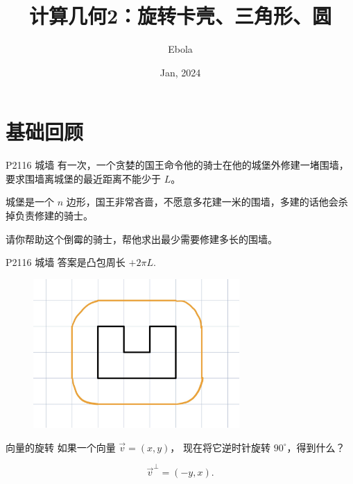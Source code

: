 \documentclass{beamer}
\author{Ebola}
\title{计算几何2：旋转卡壳、三角形、圆}
\institute{
    Institute of Mathematics, \\
    Zhejiang University.
}
\date{Jan, 2024}
\begin{document}
\begin{frame}
    \titlepage
\end{frame}

\begin{frame}
    \tableofcontents[sectionstyle=show,subsectionstyle=show/shaded/hide,subsubsectionstyle=show/shaded/hide]
\end{frame}

\section{基础回顾}

\begin{frame}[fragile]{P2116 城墙}
有一次，一个贪婪的国王命令他的骑士在他的城堡外修建一堵围墙，要求围墙离城堡的最近距离不能少于 $L$。

城堡是一个 $n$ 边形，国王非常吝啬，不愿意多花建一米的围墙，多建的话他会杀掉负责修建的骑士。

请你帮助这个倒霉的骑士，帮他求出最少需要修建多长的围墙。
\end{frame}

\begin{frame}[fragile]{P2116 城墙}
答案是凸包周长 $+2\pi L$.

\begin{figure}[H]
    \centering
    \includegraphics[width=0.7\textwidth]{pic/p2116.jpg}
\end{figure}
\end{frame}

\begin{frame}[fragile]{向量的旋转}
    如果一个向量 $\overrightarrow{v}=(x,y)$，
    现在将它逆时针旋转 $90^\circ$，得到什么？

    \vspace{1em}\pause
    \begin{equation}
        \overrightarrow{v}^\perp=(-y,x).
    \end{equation}

\end{frame}
\end{document}
